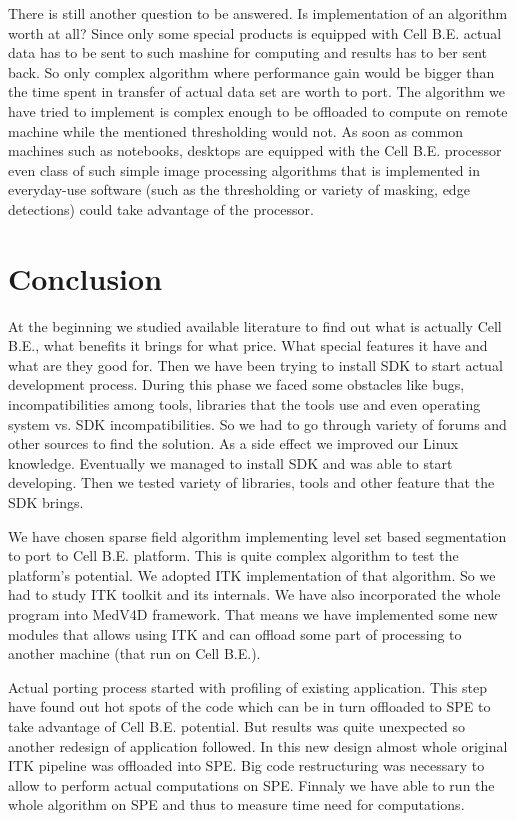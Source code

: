 \par
There is still another question to be answered.
Is implementation of an algorithm worth at all?
Since only some special products is equipped with Cell B.E. actual data has to be sent to such mashine for computing and results has to ber sent back.
So only complex algorithm where performance gain would be bigger than the time spent in transfer of actual data set are worth to port.
The algorithm we have tried to implement is complex enough to be offloaded to compute on remote machine while the mentioned thresholding would not.
As soon as common machines such as notebooks, desktops are equipped with the Cell B.E. processor even class of such simple image processing algorithms that is implemented in everyday-use software (such as the thresholding or variety of masking, edge detections) could take advantage of the processor.

\chapter{Conclusion}

\par
At the beginning we studied available literature to find out what is actually Cell B.E., what benefits it brings for what price.
What special features it have and what are they good for.
Then we have been trying to install SDK to start actual development process.
During this phase we faced some obstacles like bugs, incompatibilities among tools, libraries that the tools use and even operating system vs. SDK incompatibilities.
So we had to go through variety of forums and other sources to find the solution.
As a side effect we improved our Linux knowledge.
Eventually we managed to install SDK and was able to start developing.
Then we tested variety of libraries, tools and other feature that the SDK brings.

\par
We have chosen sparse field algorithm implementing level set based segmentation to port to Cell B.E. platform.
This is quite complex algorithm to test the platform's potential.
We adopted ITK implementation of that algorithm.
So we had to study ITK toolkit and its internals.
We have also incorporated the whole program into MedV4D framework.
That means we have implemented some new modules that allows using ITK and can offload some part of processing to another machine (that run on Cell B.E.).

\par
Actual porting process started with profiling of existing application.
This step have found out hot spots of the code which can be in turn offloaded to SPE to take advantage of Cell B.E. potential.
But results was quite unexpected so another redesign of application followed.
In this new design almost whole original ITK pipeline was offloaded into SPE.
Big code restructuring was necessary to allow to perform actual computations on SPE.
Finnaly we have able to run the whole algorithm on SPE and thus to measure time need for computations.

